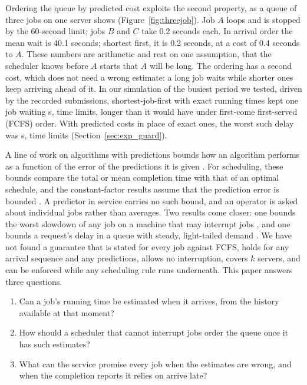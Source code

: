 Ordering the queue by predicted cost exploits the second property, as a queue of three
jobs on one server shows (Figure~\ref{fig:threejob}). Job $A$ loops and is stopped by the
60-second limit; jobs $B$ and $C$ take 0.2 seconds each. In arrival order the mean wait is
40.1 seconds; shortest first, it is 0.2 seconds, at a cost of 0.4 seconds to $A$. These
numbers are arithmetic and rest on one assumption, that the scheduler knows before $A$
starts that $A$ will be long. The ordering has a second cost, which does not need a wrong
estimate: a long job waits while shorter ones keep arriving ahead of it. In our simulation
of the busiest period we tested, driven by the recorded submissions, shortest-job-first
with exact running times kept one job waiting  s,  time
limits, longer than it would have under first-come first-served (FCFS) order. With
predicted costs in place of exact ones, the worst such delay was  s,
 time limits (Section~\ref{sec:exp_guard}).



A line of work on algorithms with predictions bounds how an algorithm performs as a
function of the error of the predictions it is given
\cite{lykouris2021caching,purohit2018predictions}. For scheduling, these bounds compare
the total or mean completion time with that of an optimal schedule, and the constant-factor
results assume that the prediction error is bounded
\cite{im2021nonclairvoyant,lattanzi2020learnedweights,lindermayr2022permutation,scully2022uniform,mitzenmacher2025queueing}.
A predictor in service carries no such bound, and an operator is asked about individual
jobs rather than averages. Two results come closer: one bounds the worst slowdown of any
job on a machine that may interrupt jobs \cite{zhao2025fairpredictions}, and one bounds a
request's delay in a queue with steady, light-tailed demand \cite{yu2024boost,yu2025twotraffics}.
We have not found a guarantee that is stated for every job against FCFS, holds for any
arrival sequence and any predictions, allows no interruption, covers $k$ servers, and can
be enforced while any scheduling rule runs underneath. This paper answers three
questions.
\begin{enumerate}
  \item Can a job's running time be estimated when it arrives, from the history available
  at that moment?
  \item How should a scheduler that cannot interrupt jobs order the queue once it has
  such estimates?
  \item What can the service promise every job when the estimates are wrong, and when the
  completion reports it relies on arrive late?
\end{enumerate}

